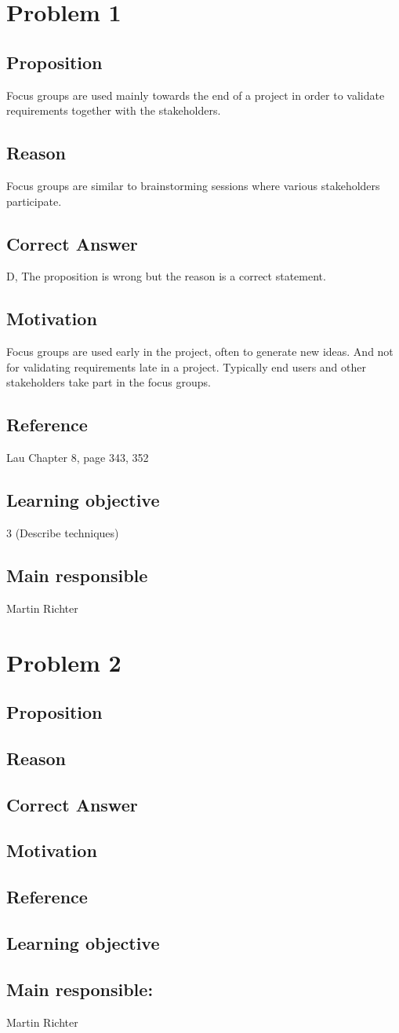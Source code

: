 \documentclass[a4paper]{article}
\begin{document}
\section{Problem 1}
\subsection{Proposition}
Focus groups are used mainly towards the end of a project in order to validate requirements together with the stakeholders.
\subsection{Reason}
Focus groups are similar to brainstorming sessions where various stakeholders participate.
\subsection{Correct Answer}
D, The proposition is wrong but the reason is a correct statement.
\subsection{Motivation}
Focus groups are used early in the project, often to generate new ideas. And not for validating requirements late in a project. Typically end users and other stakeholders take part in the focus groups.
\subsection{Reference}
Lau Chapter 8, page 343, 352
\subsection{Learning objective}
3 (Describe techniques)
\subsection{Main responsible}
Martin Richter

\section{Problem 2}
\subsection{Proposition}
\subsection{Reason}
\subsection{Correct Answer}
\subsection{Motivation}
\subsection{Reference}
\subsection{Learning objective}
\subsection{Main responsible:}
Martin Richter
\end{document}
